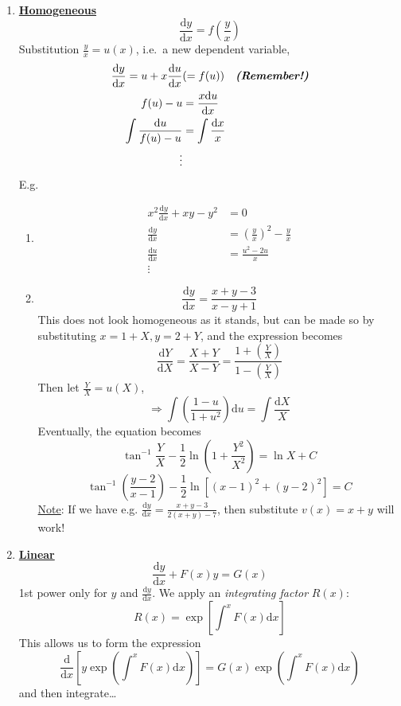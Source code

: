 \documentclass[12pt]{report}
\theoremstyle{definition}
\begin{document}
\begin{enumerate}[label = (\alph*)]
\item \textbf{\underline{Homogeneous}} \[
        \frac{\mathrm{d}y}{\mathrm{d}x} = f\left(\frac{y}{x}\right) 
    \]Substitution $\frac{y}{x} = u(x)$,
    i.e.\ a new dependent variable, \[
        \begin{align*}
            \frac{\mathrm{d}y}{\mathrm{d}x} = u + x\frac{\mathrm{d}u}{\mathrm{d}x} & (= f(u)) 
            \quad \text{\textbf{\emph{(Remember!)}}} \\
            f(u) - u & = \frac{x\mathrm{d}u}{\mathrm{d}x} \\
            \int \frac{\mathrm{d}u}{f(u) - u} & = \int \frac{\mathrm{d}x}{x} \\
            \vdots
        \end{align*}
    \]
    E.g. 
    \begin{enumerate}[label = (\roman*)]
        \item \[
            \begin{align*}
                x^{2} \frac{\mathrm{d}y}{\mathrm{d}x} + xy - y^{2} & = 0 \\
                \frac{\mathrm{d}y}{\mathrm{d}x} & = {\left(\frac{y}{x}\right)}^{2} - \frac{y}{x} \\
                \frac{\mathrm{d}u}{\mathrm{d}x} & = \frac{u^{2} - 2u}{x} \\
                \vdots
            \end{align*}
        \]
    \item \[
        \frac{\mathrm{d}y}{\mathrm{d}x} = \frac{x + y - 3}{x - y + 1}
    \]This does not look homogeneous as it stands, but can be made so by substituting
    $x= 1 + X, y = 2 + Y$, and the expression becomes\[
        \frac{\mathrm{d}Y}{\mathrm{d}X} = \frac{X + Y}{X - Y} 
        = \frac{1 + \left(\frac{Y}{X}\right)}{1 - \left(\frac{Y}{X}\right)}
    \]Then let $\frac{Y}{X} = u(X)$,\[
    \Rightarrow \int \left(\frac{1-u}{1+u^2}\right) \mathrm{d}u = \int \frac{\mathrm{d}X}{X}
    \]
    Eventually, the equation becomes\[
        \tan^{-1}{\frac{Y}{X}} - \frac{1}{2} \ln{\left(1 + \frac{Y^2}{X^2}\right)} 
        = \ln{X} + C
    \]\[
    \tan^{-1}{\left(\frac{y-2}{x-1}\right)} - \frac{1}{2} \ln{\left[{(x-1)}^{2} + {(y-2)}^{2}\right] } = C
    \]
    \underline{Note}: If we have e.g. $\frac{\mathrm{d}y}{\mathrm{d}x} = \frac{x + y - 3}{2(x + y) - 7}$,
    then substitute $v(x) = x + y$ will work!
    \end{enumerate}

\item \textbf{\underline{Linear}} \[
        \frac{\mathrm{d}y}{\mathrm{d}x} + F(x)y = G(x)
        \]
        1st power only for $y$ and $\frac{\mathrm{d}y}{\mathrm{d}x} $.
        We apply an \emph{integrating factor} $R(x)$: \[
R(x) = \exp{\left[\int_{}^{x} F(x)\mathrm{d}x\right] }
\] This allows us to form the expression\[
\frac{\mathrm{d}}{\mathrm{d}x} \left[y \exp{\left(\int_{}^{x} F(x)\mathrm{d}x\right) }\right] 
= G(x) \exp{\left(\int_{}^{x} F(x)\mathrm{d}x\right) }
\]and then integrate\ldots


\end{enumerate}
\end{document}
